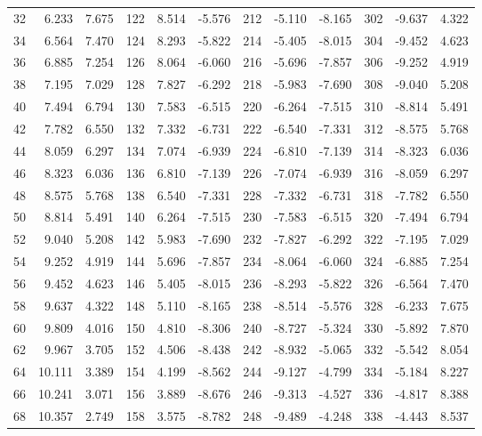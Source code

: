 \begin{table}
{\begin{tabular}{rrr|rrr|rrr|rrr}
 32 &   6.233 &  7.675 & 122 &   8.514 & -5.576 & 212 &  -5.110 & -8.165 & 302 &  -9.637 &  4.322\\
 34 &   6.564 &  7.470 & 124 &   8.293 & -5.822 & 214 &  -5.405 & -8.015 & 304 &  -9.452 &  4.623\\
 36 &   6.885 &  7.254 & 126 &   8.064 & -6.060 & 216 &  -5.696 & -7.857 & 306 &  -9.252 &  4.919\\
 38 &   7.195 &  7.029 & 128 &   7.827 & -6.292 & 218 &  -5.983 & -7.690 & 308 &  -9.040 &  5.208\\
 40 &   7.494 &  6.794 & 130 &   7.583 & -6.515 & 220 &  -6.264 & -7.515 & 310 &  -8.814 &  5.491\\
 42 &   7.782 &  6.550 & 132 &   7.332 & -6.731 & 222 &  -6.540 & -7.331 & 312 &  -8.575 &  5.768\\
 44 &   8.059 &  6.297 & 134 &   7.074 & -6.939 & 224 &  -6.810 & -7.139 & 314 &  -8.323 &  6.036\\
 46 &   8.323 &  6.036 & 136 &   6.810 & -7.139 & 226 &  -7.074 & -6.939 & 316 &  -8.059 &  6.297\\
 48 &   8.575 &  5.768 & 138 &   6.540 & -7.331 & 228 &  -7.332 & -6.731 & 318 &  -7.782 &  6.550\\
 50 &   8.814 &  5.491 & 140 &   6.264 & -7.515 & 230 &  -7.583 & -6.515 & 320 &  -7.494 &  6.794\\
 52 &   9.040 &  5.208 & 142 &   5.983 & -7.690 & 232 &  -7.827 & -6.292 & 322 &  -7.195 &  7.029\\
 54 &   9.252 &  4.919 & 144 &   5.696 & -7.857 & 234 &  -8.064 & -6.060 & 324 &  -6.885 &  7.254\\
 56 &   9.452 &  4.623 & 146 &   5.405 & -8.015 & 236 &  -8.293 & -5.822 & 326 &  -6.564 &  7.470\\
 58 &   9.637 &  4.322 & 148 &   5.110 & -8.165 & 238 &  -8.514 & -5.576 & 328 &  -6.233 &  7.675\\
 60 &   9.809 &  4.016 & 150 &   4.810 & -8.306 & 240 &  -8.727 & -5.324 & 330 &  -5.892 &  7.870\\
 62 &   9.967 &  3.705 & 152 &   4.506 & -8.438 & 242 &  -8.932 & -5.065 & 332 &  -5.542 &  8.054\\
 64 &  10.111 &  3.389 & 154 &   4.199 & -8.562 & 244 &  -9.127 & -4.799 & 334 &  -5.184 &  8.227\\
 66 &  10.241 &  3.071 & 156 &   3.889 & -8.676 & 246 &  -9.313 & -4.527 & 336 &  -4.817 &  8.388\\
 68 &  10.357 &  2.749 & 158 &   3.575 & -8.782 & 248 &  -9.489 & -4.248 & 338 &  -4.443 &  8.537\\

\end{tabular}}
\end{table}
